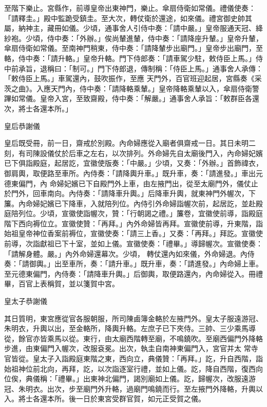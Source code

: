 \begin{pinyinscope}
 至階下樂止。宮縣作，前導皇帝出東神門，樂止。傘扇侍衛如常儀。禮儀使奏：「請釋圭。」殿中監跪受鎮圭。至大次，轉仗衛於還途，如來儀。禮宮御史帥其屬，納神主，藏冊如儀。少頃，通事舍人引侍中奏：「請中嚴。」皇帝服通天冠、絳紗袍。少頃，侍中奏：「外辦。」俟尚輦進輦，侍中奏：「請降座升輦。」皇帝升輦，傘扇侍衛如常儀。至南神門稍東，侍中奏：「請降輦步出廟門。」皇帝步出廟門，至輅，侍中奏：「請升輅。」皇帝升輅。門下侍郎奏：「請車駕少駐，敕侍臣上馬。」侍中前承旨，退稱曰：「制可。」門下侍郎退，傳制稱：「侍臣上馬。」通事舍人承傳：「敕侍臣上馬。」車駕還內，鼓吹振作，至應
 天門外，百官班迎起居，宮縣奏《采茨之曲》。入應天門內，侍中奏：「請降輅乘輦。」皇帝降輅乘輦以入，傘扇侍衛警蹕如常儀。皇帝入宮，至致齋殿，侍中奏：「解嚴。」通事舍人承旨：「敕群臣各還次，將士各還本所。」



 皇后恭謝儀



 皇后既受冊，前一日，齋戒於別殿。內命婦應從入廟者俱齋戒一日。其日未明二刻，有司陳設儀仗於后車之左右，以次排列。外命婦先自太廟後門入，內命婦妃嬪已下俱詣殿庭，起居訖，宜徽使版奏：「中嚴。」少頃，又奏：「外辦。」首飾禕衣，御肩輿，取便路至車所。內侍奏：「請降輿升車。」既升車，奏：「請進發。」車出元德東偏門，內
 命婦妃嬪已下自殿門外上車，由左掖門出，從至太廟門外，儀仗止於門外，回車南向。內侍奏：「請降車升輿。」后降車升輿，就東神門外幄次，下簾。內命婦妃嬪已下降車，入就陪列位。內侍引外命婦詣幄次前，起居訖，並赴殿庭陪列位。少頃，宣徽使詣幄次，贊：「行朝謁之禮。」簾卷，宜徽使前導，詣殿庭階下西向褥位立。宣徽使贊：「再拜。」內外命婦皆再拜。宣徽使前導，升東階，詣始祖皇帝神位香案前褥位，宣徽使奏：「請三上香。」又奏：「再拜。」拜訖。宣徽使前導，次詣獻祖已下十室，並如上儀。宣徽使奏：「禮畢。」導歸幄次。宣徽使奏：「請解身體。嚴。」內外命婦還幕次。少頃，
 轉仗還內如來儀，外命婦退。內侍奏：「請御輿。」出至車所，奏：「請升車。」既升車，奏：「請進發。」內命婦上車。至元德東偏門，內侍奏：「請降車升輿。」后御輿，取便路還內，內命婦從入。冊禮畢，百官上表稱賀，並以箋賀中宮。



 皇太子恭謝儀



 其日質明，東宮應從官各服朝服，所司陳鹵簿金輅於左掖門外。皇太子服遠游冠、朱明衣，升輿以出，至金輅所，降輿升輅。左庶子已下夾侍。三帥、三少乘馬導從，餘官亦皆乘馬以從。東行，由太廟西階轉至廟，不鳴鐃吹。至廟西偏門外降輅步進，由東偏門入幄次，改服袞冕。出次，執圭自南神東偏門入，宮官并太
 常寺官皆從。皇太子入詣殿庭東階之東，西向立，典儀贊：「再拜。」訖，升自西階，詣始祖神位前北向，再拜，訖，以次詣逐室行禮，並如上儀。訖，降自西階，復西向位俟，典儀稱：「禮畢。」出東神北偏門，謁別廟如上儀。訖，歸幄次，改服遠游冠、朱明衣。出次，步至廟門外升輅，過廟門鳴鐃而行。至左掖門外降輅，升輿以入。將士各還本所。後一日於東宮受群官賀，如元正受賀之儀。




\end{pinyinscope}

